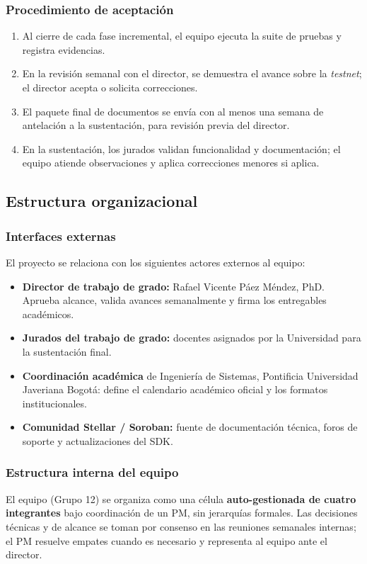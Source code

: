 \documentclass[12pt,oneside]{report}
\begin{document}
      \subsubsection{Procedimiento de aceptación}
      \begin{enumerate}
        \item Al cierre de cada fase incremental, el equipo ejecuta la suite de pruebas y registra evidencias.
        \item En la revisión semanal con el director, se demuestra el avance sobre la \textit{testnet}; el director acepta o solicita correcciones.
        \item El paquete final de documentos se envía con al menos una semana de antelación a la sustentación, para revisión previa del director.
        \item En la sustentación, los jurados validan funcionalidad y documentación; el equipo atiende observaciones y aplica correcciones menores si aplica.
      \end{enumerate}

    \subsection{Estructura organizacional}
    \label{subsec:organizacion}

      \subsubsection{Interfaces externas}
      El proyecto se relaciona con los siguientes actores externos al equipo:
      \begin{itemize}
        \item \textbf{Director de trabajo de grado:} Rafael Vicente Páez Méndez, PhD. Aprueba alcance, valida avances semanalmente y firma los entregables académicos.
        \item \textbf{Jurados del trabajo de grado:} docentes asignados por la Universidad para la sustentación final.
        \item \textbf{Coordinación académica} de Ingeniería de Sistemas, Pontificia Universidad Javeriana Bogotá: define el calendario académico oficial y los formatos institucionales.
        \item \textbf{Comunidad Stellar / Soroban:} fuente de documentación técnica, foros de soporte y actualizaciones del SDK.
      \end{itemize}

      \subsubsection{Estructura interna del equipo}
      El equipo (Grupo 12) se organiza como una célula \textbf{auto-gestionada de cuatro integrantes} bajo coordinación de un PM, sin jerarquías formales. Las decisiones técnicas y de alcance se toman por consenso en las reuniones semanales internas; el PM resuelve empates cuando es necesario y representa al equipo ante el director.
\end{document}
